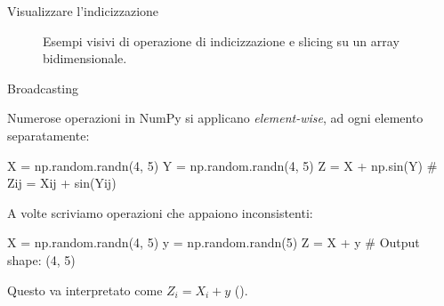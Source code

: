 \documentclass[12pt,aspectratio=169]{beamer}
\begin{document}
\begin{whiteframe}{Visualizzare l'indicizzazione}
	
	\begin{figure}
		\centering
		\caption{Esempi visivi di operazione di indicizzazione e slicing su un array bidimensionale.}
	\end{figure}
	
\end{whiteframe}

\begin{frame}[fragile]{Broadcasting}
	
	Numerose operazioni in NumPy si applicano \textit{element-wise}, ad ogni elemento separatamente:
	\begin{python}
		X = np.random.randn(4, 5)
		Y = np.random.randn(4, 5)
		Z = X + np.sin(Y) # Zij = Xij + sin(Yij)
	\end{python}
	
	A volte scriviamo operazioni che appaiono inconsistenti:
	\begin{python}
		X = np.random.randn(4, 5)
		y = np.random.randn(5)
		Z = X + y # Output shape: (4, 5)
	\end{python}
	
	Questo va interpretato come $Z_i = X_i + y$ ().
	
\end{frame}
\end{document}
